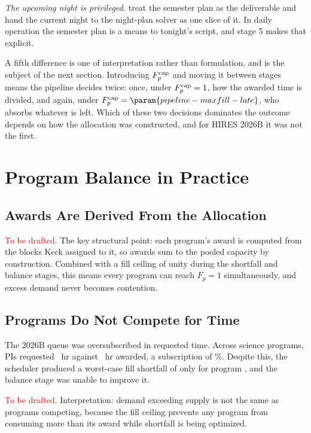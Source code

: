 \documentclass[twocolumn,linenumbers]{aastex63}
\newcommand{\red}[1]{\textcolor{red}{#1}}
\newcommand{\Fp}{\ensuremath{F_p}\xspace}
\newcommand{\maxfill}{\ensuremath{F^{\rm cap}_p}\xspace}
\begin{document}
\emph{The upcoming night is privileged.} \citet{Lubin2025} treat the semester
plan as the deliverable and hand the current night to the night-plan solver as
one slice of it. In daily operation the semester plan is a means to tonight's
script, and stage 5 makes that explicit.

A fifth difference is one of interpretation rather than formulation, and is the
subject of the next section. Introducing \maxfill and moving it between stages
means the pipeline decides twice: once, under $\maxfill = 1$, how the awarded
time is divided, and again, under
$\maxfill = \param{pipeline-maxfill-late}$, who absorbs whatever is left. Which
of these two decisions dominates the outcome depends on how the allocation was
constructed, and for HIRES 2026B it was not the first.

\section{Program Balance in Practice}
\label{sec:balance}

\subsection{Awards Are Derived From the Allocation}
\label{sec:balance:construction}

\red{To be drafted.} The key structural point: each program's award is
computed from the blocks Keck assigned to it, so awards sum to the pooled
capacity by construction. Combined with a fill ceiling of unity during the
shortfall and balance stages, this means every program can reach
$\Fp = 1$ simultaneously, and excess demand never becomes contention.

\subsection{Programs Do Not Compete for Time}
\label{sec:balance:nocompete}

The 2026B queue was oversubscribed in requested time. Across
 science programs, PIs requested
~hr against ~hr awarded, a
subscription of \%. Despite this, the scheduler
produced a worst-case fill shortfall of only
 for program ,
and the balance stage was unable to improve it.

\red{To be drafted.} Interpretation: demand exceeding supply is not the same
as programs competing, because the fill ceiling prevents any program from
consuming more than its award while shortfall is being optimized.
\end{document}
